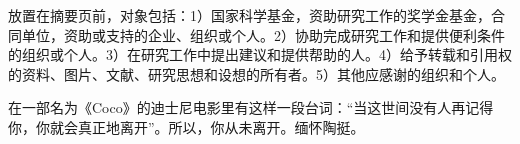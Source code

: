 放置在摘要页前，对象包括：1）国家科学基金，资助研究工作的奖学金基金，合同单位，资助或支持的企业、组织或个人。2）协助完成研究工作和提供便利条件的组织或个人。3）在研究工作中提出建议和提供帮助的人。4）给予转载和引用权的资料、图片、文献、研究思想和设想的所有者。5）其他应感谢的组织和个人。

在一部名为《Coco》的迪士尼电影里有这样一段台词：“当这世间没有人再记得你，你就会真正地离开”。所以，你从未离开。缅怀陶挺。